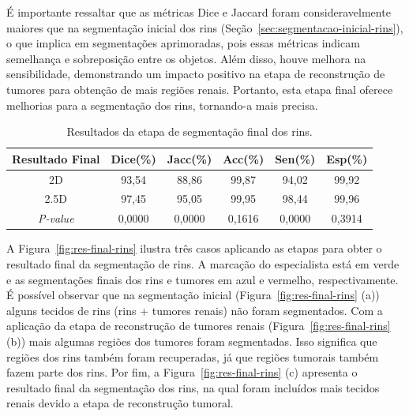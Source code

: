 É importante ressaltar que as métricas Dice e Jaccard foram consideravelmente maiores que na segmentação inicial dos rins (Seção~\ref{sec:segmentacao-inicial-rins}), o que implica em segmentações aprimoradas, pois essas métricas indicam semelhança e sobreposição entre os objetos. Além disso, houve melhora na sensibilidade, demonstrando um impacto positivo na etapa de reconstrução de tumores para obtenção de mais regiões renais. Portanto, esta etapa final oferece melhorias para a segmentação dos rins, tornando-a mais precisa.

\begin{table}[!ht]
\caption{Resultados da etapa de segmentação final dos rins.}
\label{tab:seg-final-rins}
\centering
\begin{tabular}{c|c|c|c|c|c}
\hline
Resultado Final  & Dice(\%)                      & Jacc(\%)                      & Acc(\%) & Sen(\%)                       & Esp(\%) \\ \hline
2D               & 93,54                          & 88,86                          & 99,87    & 94,02                          & 99,92    \\ \hline
2.5D             & 97,45                          & 95,05                          & 99,95    & 98,44                          & 99,96    \\ \hline
\textit{P-value} & \cellcolor[HTML]{C0C0C0}0,0000 & \cellcolor[HTML]{C0C0C0}0,0000 & 0,1616   & \cellcolor[HTML]{C0C0C0}0,0000 & 0,3914   \\ \hline
\end{tabular}
\end{table}

A Figura~\ref{fig:res-final-rins} ilustra três casos aplicando as etapas para obter o resultado final da segmentação de rins. A marcação do especialista está em verde e as segmentações finais dos rins e tumores em azul e vermelho, respectivamente. É possível observar que na segmentação inicial (Figura~\ref{fig:res-final-rins} (a)) alguns tecidos de rins (rins + tumores renais) não foram segmentados. Com a aplicação da etapa de reconstrução de tumores renais (Figura~\ref{fig:res-final-rins} (b)) mais algumas regiões dos tumores foram segmentadas. Isso significa que regiões dos rins também foram recuperadas, já que regiões tumorais também fazem parte dos rins. Por fim, a Figura~\ref{fig:res-final-rins} (c) apresenta o resultado final da segmentação dos rins, na qual foram incluídos mais tecidos renais devido a etapa de reconstrução tumoral.

